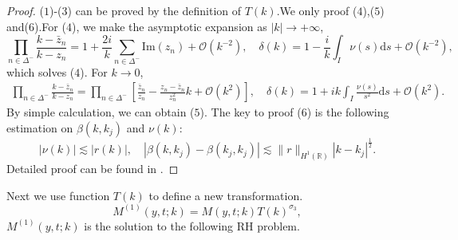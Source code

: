 \documentclass[11pt]{article}
\numberwithin{equation}{section}
\begin{document}
 \begin{proof}
     ($1$)-($3$) can be proved by the definition of $T(k)$.We only proof ($4$),($5$) and($6$).For ($4$), we make the asymptotic expansion as $|k|\to+\infty$,
     \begin{equation*}
       \prod_{n \in \Delta^-} \frac{k-\bar{z}_n}{k-z_n}=1+\frac{2i}{k}\sum_{n\in\Delta^-}\mathrm{Im}(z_n)+\mathcal{O}(k^{-2}) ,\quad \delta(k)=1-\frac{i}{k}\int_I\nu(s)\mathrm{d}s+\mathcal{O}(k^{-2}),
     \end{equation*}
which solves ($4$).
For $k\to0$,
\begin{align*}
 \prod_{n \in \Delta^-} \frac{k-\bar{z}_n}{k-z_n}=\prod_{n \in \Delta^-}\left[\frac{\bar{z}_n}{z_n}-\frac{z_n-\bar{z}_n}{z_n^2}k+\mathcal{O}(k^2)\right],\quad
\delta(k)=1+ik\int_I\frac{\nu(s)}{s^2}\mathrm{d}s+\mathcal{O}(k^2).
\end{align*}
By simple calculation, we can obtain ($5$).
The key to proof ($6$) is the following estimation on $\beta(k,k_j)$ and $\nu(k)$:
\begin{equation}
   |\nu(k)|\lesssim|r(k)|,\quad|\beta(k,k_j)-\beta(k_j,k_j)|\lesssim\|r\|_{H^1(\mathbb{R})}\left|k-k_j\right|^{\frac{1}{2}}.
\end{equation}
Detailed proof can be found in \cite{borghese-2018-2}.

 \end{proof}



Next we use function $T(k)$ to define a new  transformation.
\begin{equation}
    M^{(1)}(y,t;k)=M(y,t;k)T(k)^{\sigma_3},\label{eq2}
\end{equation}
$M^{(1)}(y,t;k)$ is the solution to the following RH problem.
\end{document}
